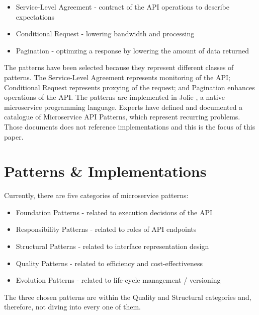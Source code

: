 \documentclass[12pt]{article}
\begin{document}
\begin{itemize}
    \item Service-Level Agreement - contract of the API operations to describe expectations
    \item Conditional Request - lowering bandwidth and processing
    \item Pagination - optimzing a response by lowering the amount of data returned
\end{itemize}

The patterns have been selected because they represent different classes of patterns. The Service-Level Agreement represents monitoring of the API; Conditional Request represents proxying of the request; and Pagination enhances operations of the API. 
The patterns are implemented in Jolie \cite{JolieAboutPage}, a native microservice programming language. Experts have defined and documented a catalogue of Microservice API Patterns, which represent recurring problems. Those documents does not reference implementations and this is the focus of this paper.

\newpage

\section{Patterns \& Implementations}

Currently, there are five categories of microservice patterns: 

\begin{itemize}
    \item Foundation Patterns - related to execution decisions of the API
    \item Responsibility Patterns - related to roles of API endpoints
    \item Structural Patterns - related to interface representation design
    \item Quality Patterns - related to efficiency and cost-effectiveness
    \item Evolution Patterns - related to life-cycle management / versioning
\end{itemize}

The three chosen patterns are within the Quality and Structural categories and, therefore, not diving into every one of them. 
\end{document}
